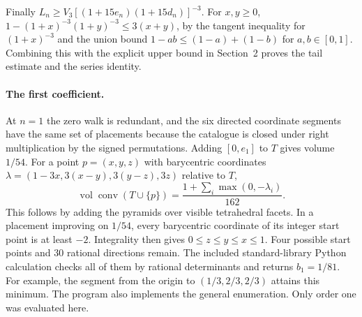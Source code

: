 Finally $L_n\ge V_3[(1+15e_n)(1+15d_n)]^{-3}$. For $x,y\ge0$,
$1-(1+x)^{-3}(1+y)^{-3}\le3(x+y)$, by the tangent inequality for
$(1+x)^{-3}$ and the union bound $1-ab\le (1-a)+(1-b)$ for
$a,b\in[0,1]$. Combining this with the explicit upper bound in Section~2 proves the tail
estimate and the series identity.

\paragraph{The first coefficient.}
At $n=1$ the zero walk is redundant, and the six directed coordinate
segments have the same set of placements because the catalogue is closed
under right multiplication by the signed permutations. Adding $[0,e_1]$
to $T$ gives volume $1/54$. For a point $p=(x,y,z)$ with barycentric
coordinates $\lambda=(1-3x,3(x-y),3(y-z),3z)$ relative to $T$,
\[
 \operatorname{vol}\operatorname{conv}(T\cup\{p\})=
 \frac{1+\sum_i\max(0,-\lambda_i)}{162}.
\]
This follows by adding the pyramids over visible tetrahedral facets.
In a placement improving on $1/54$, every barycentric coordinate of
its integer start point is at least $-2$. Integrality then gives
$0\le z\le y\le x\le1$. Four possible start points and $30$ rational
directions remain. The included standard-library Python calculation
checks all of them by rational determinants and returns
$b_1=1/81$. For example, the segment from the origin to $(1/3,2/3,2/3)$ attains this minimum. The program also implements the general enumeration. Only order one was evaluated here.
